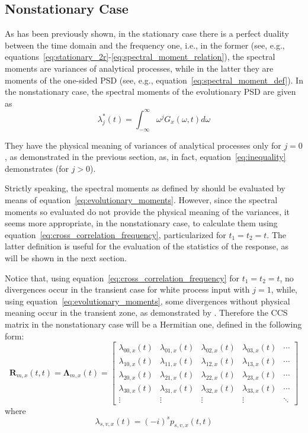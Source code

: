 \documentclass[11pt]{article}
\begin{document}
\subsection{Nonstationary Case}
\label{sec:spectral_nonstationary}

As has been previously shown, in the stationary case there is a perfect duality between the time domain and the frequency one, i.e., in the former (see, e.g., equations~\eqref{eq:stationary_2r}-\eqref{eq:spectral_moment_relation}), the spectral moments are variances of analytical processes, while in the latter they are moments of the one-sided PSD (see, e.g., equation~\eqref{eq:spectral_moment_def}). In the nonstationary case, the spectral moments of the evolutionary PSD are given as
\begin{equation}
\lambda_j^*(t) = \int_{-\infty}^{\infty} \omega^j G_x(\omega, t) d\omega
\label{eq:evolutionary_moments}
\end{equation}

They have the physical meaning of variances of analytical processes only for $j = 0$, as demonstrated in the previous section, as, in fact, equation~\eqref{eq:inequality} demonstrates (for $j > 0$).

Strictly speaking, the spectral moments as defined by \cite{vanmarcke1972,vanmarcke1975} should be evaluated by means of equation~\eqref{eq:evolutionary_moments}. However, since the spectral moments so evaluated do not provide the physical meaning of the variances, it seems more appropriate, in the nonstationary case, to calculate them using equation~\eqref{eq:cross_correlation_frequency}, particularized for $t_1 = t_2 = t$. The latter definition is useful for the evaluation of the statistics of the response, as will be shown in the next section.

Notice that, using equation~\eqref{eq:cross_correlation_frequency} for $t_1 = t_2 = t$, no divergences occur in the transient case for white process input with $j = 1$, while, using equation~\eqref{eq:evolutionary_moments}, some divergences without physical meaning occur in the transient zone, as demonstrated by \cite{corotis1972}. Therefore the CCS matrix in the nonstationary case will be a Hermitian one, defined in the following form:
\begin{equation}
\mathbf{R}_{m,x}(t,t) = \boldsymbol{\Lambda}_{m,x}(t) = \begin{bmatrix}
\lambda_{00,x}(t) & \lambda_{01,x}(t) & \lambda_{02,x}(t) & \lambda_{03,x}(t) & \cdots \\
\lambda_{10,x}(t) & \lambda_{11,x}(t) & \lambda_{12,x}(t) & \lambda_{13,x}(t) & \cdots \\
\lambda_{20,x}(t) & \lambda_{21,x}(t) & \lambda_{22,x}(t) & \lambda_{23,x}(t) & \cdots \\
\lambda_{30,x}(t) & \lambda_{31,x}(t) & \lambda_{32,x}(t) & \lambda_{33,x}(t) & \cdots \\
\vdots & \vdots & \vdots & \vdots & \ddots
\end{bmatrix}
\label{eq:nonstationary_ccs}
\end{equation}
where
\begin{equation}
\lambda_{s,v,x}(t) = (-i)^s p_{s,v,x}(t,t)
\label{eq:nonstationary_moment_def}
\end{equation}
\end{document}

